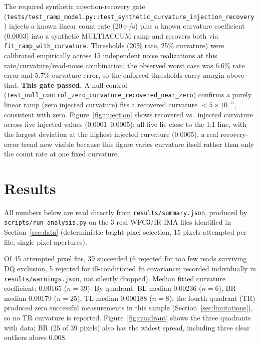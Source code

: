 \documentclass[11pt]{article}
\begin{document}
The required synthetic injection-recovery gate
(\texttt{tests/test\_ramp\_model.py::test\_synthetic\_curvature\_injection\_recovery})
injects a known linear count rate (20\,e-/s) plus a known curvature
coefficient (0.0003) into a synthetic MULTIACCUM ramp and recovers both via
\texttt{fit\_ramp\_with\_curvature}. Thresholds (20\% rate, 25\% curvature)
were calibrated empirically across 15 independent noise realizations at this
rate/curvature/read-noise combination; the observed worst case was 6.6\% rate
error and 5.7\% curvature error, so the enforced thresholds carry margin
above that. \textbf{This gate passed.} A null control
(\texttt{test\_null\_control\_zero\_curvature\_recovered\_near\_zero}) confirms
a purely linear ramp (zero injected curvature) fits a recovered curvature
$<5\times10^{-5}$, consistent with zero. Figure~\ref{fig:injection} shows
recovered vs.\ injected curvature across five injected values
(0.0001--0.0005); all five lie close to the 1:1 line, with the largest
deviation at the highest injected curvature (0.0005), a real recovery-error
trend now visible because this figure varies curvature itself rather than
only the count rate at one fixed curvature.

\section{Results}
\label{sec:results}
All numbers below are read directly from \texttt{results/summary.json},
produced by \texttt{scripts/run\_analysis.py} on the 3 real WFC3/IR IMA
files identified in Section~\ref{sec:data} (deterministic bright-pixel
selection, 15 pixels attempted per file, single-pixel apertures).

Of 45 attempted pixel fits, 39 succeeded (6 rejected for too few reads
surviving DQ exclusion, 5 rejected for ill-conditioned fit covariance;
recorded individually in \texttt{results/warnings.json}, not silently
dropped). Median fitted curvature coefficient: 0.00165 ($n=39$). By
quadrant: BL median 0.00236 ($n=6$), BR median 0.00179 ($n=25$), TL median
0.000188 ($n=8$); the fourth quadrant (TR) produced zero successful
measurements in this sample (Section~\ref{sec:limitations}), so no TR
curvature is reported. Figure~\ref{fig:quadrant} shows the three quadrants
with data; BR (25 of 39 pixels) also has the widest spread, including three
clear outliers above 0.008.
\end{document}
